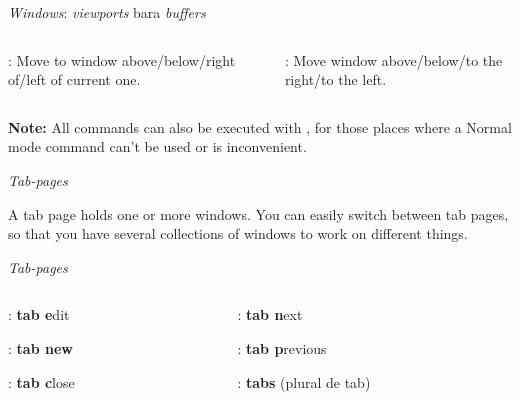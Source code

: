\begin{frame}{\textit{Windows}: \textit{viewports} bara \textit{buffers}}
  \begin{columns}
    \begin{column}{0.5\linewidth}
      \begin{widedescription}
        \item {}: Move to window above/below/right of/left of current one.
      \end{widedescription}
    \end{column}
    \begin{column}{0.5\linewidth}
      \begin{widedescription}
        \item {}: Move window above/below/to the right/to the left.
      \end{widedescription}
    \end{column}
  \end{columns}
  \vspace{1cm}
  \textbf{Note:} All  commands can also be executed with , for those places where a Normal
  mode command can't be used or is inconvenient\cite{vimReferenceManual}.
\end{frame}

\begin{frame}{\textit{Tab-pages}}
  \begin{widedescription}
  \item A tab page holds one or more windows.  You can easily switch between tab
  pages, so that you have several collections of windows to work on different
  things\cite{vimReferenceManual}.
  \end{widedescription}
\end{frame}

\begin{frame}{\textit{Tab-pages}}
  \begin{columns}
    \begin{column}{0.5\linewidth}
      \begin{widedescription}
        \item {}:   \textbf{tab e}dit
        \item {}: \textbf{tab new}
        \item {}:   \textbf{tab c}lose
      \end{widedescription}
    \end{column}
    \begin{column}{0.5\linewidth}
      \begin{widedescription}
        \item {}:   \textbf{tab n}ext
        \item {}:   \textbf{tab p}revious
        \item {}:   \textbf{tabs} (plural de tab)
      \end{widedescription}
    \end{column}
  \end{columns}
\end{frame}
